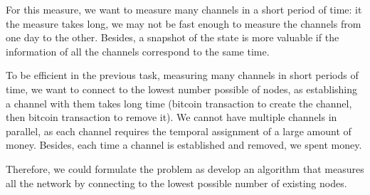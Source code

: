 For this measure, we want to measure many channels in a short period of time: it the measure takes long, we may not be fast enough to measure the channels from one day to the other. Besides, a snapshot of the state is more valuable if the information of all the channels correspond to the same time. 

To be efficient in the previous task, measuring many channels in short periods of time, 
we want to connect to the lowest number possible of nodes, as establishing a channel with them takes long time 
(bitcoin transaction to create the channel, then bitcoin transaction to remove it). 
We cannot have multiple channels in parallel, as each channel requires the temporal assignment of a large amount of money. 
Besides, each time a channel is established and removed, we spent money. 

Therefore, we could formulate the problem as develop an algorithm that measures all the network by connecting to the lowest possible number of existing nodes.

